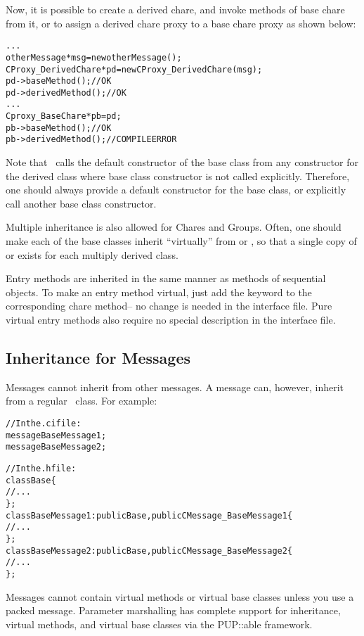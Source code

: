Now, it is possible to create a derived chare, and invoke methods of base
chare from it, or to assign a derived chare proxy to a base chare proxy
as shown below:

\begin{alltt}
  ...
  otherMessage *msg = new otherMessage();
  CProxy_DerivedChare *pd = new CProxy_DerivedChare(msg);
  pd->baseMethod();     // OK
  pd->derivedMethod();  // OK
  ...
  Cproxy_BaseChare *pb = pd;
  pb->baseMethod();    // OK
  pb->derivedMethod(); // COMPILE ERROR
\end{alltt}

Note that \CC\ calls the default constructor  of the
base class from any constructor for the derived class where base class
constructor is not called explicitly. Therefore, one should always provide a
default constructor for the base class, or explicitly call another base
class constructor.

Multiple inheritance  is also allowed for Chares
and Groups. Often, one should make each of the base classes inherit
``virtually'' from  or , so that a single copy of
 or  exists for each multiply derived class.

Entry methods are inherited in the
same manner as methods of sequential \CC{} objects.  
To make an entry method virtual, just add the keyword 
to the corresponding chare method-- no change is needed in the interface file.
Pure virtual entry methods also require no special description
in the interface file.


\subsection{Inheritance for Messages}

Messages cannot inherit from other messages.  A message can, however,
inherit from a regular \CC\ class.  For example:

\begin{alltt}
//In the .ci file:
  message BaseMessage1;
  message BaseMessage2;

//In the .h file:
  class Base \{
    // ...
  \};
  class BaseMessage1 : public Base, public CMessage_BaseMessage1 \{
    // ...
  \};
  class BaseMessage2 : public Base, public CMessage_BaseMessage2 \{
    // ...
  \};
\end{alltt}

Messages cannot contain virtual methods
or virtual base classes unless you use a packed message.
Parameter marshalling has complete support for inheritance, virtual
methods, and virtual base classes via the PUP::able framework.



